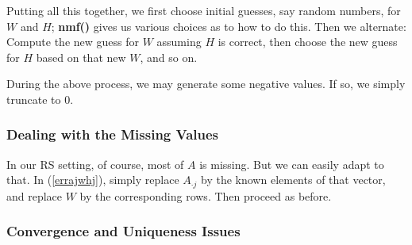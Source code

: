 Putting all this together, we first choose initial guesses, say random
numbers, for $W$ and $H$; {\bf nmf()} gives us various choices as to how
to do this.  Then we alternate: Compute the new guess for $W$ assuming
$H$ is correct, then choose the new guess for $H$ based on that new $W$,
and so on.

During the above process, we may generate some negative values.  If so,
we simply truncate to 0.

\subsubsection{Dealing with the Missing Values}

In our RS setting, of course, most of $A$ is missing.  But we can easily
adapt to that.  In (\ref{errajwhj}), simply replace $A_{\cdot j}$ by the
known elements of that vector, and replace $W$ by the corresponding
rows.  Then proceed as before.

% 
% 
% 
% 
% 

\subsubsection{Convergence and Uniqueness Issues}


